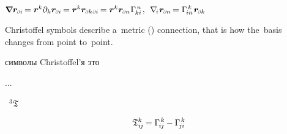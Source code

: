 \begin{otherlanguage}{russian}
${
\boldnabla \locationvector_\differentialindex{i} \hspace{-0.2ex}
= \locationvector^k \partial_k \locationvector_\differentialindex{i} \hspace{-0.2ex}
= \locationvector^k \locationvector_{\differentialindex{k}\hspace{.2ex}\differentialindex{i}} \hspace{-0.2ex}
= \locationvector^k \locationvector_\differentialindex{n} \hspace{.1ex} \Gamma_{\hspace{-0.25ex}ki}^{\hspace{.25ex}n}
\hspace{.2ex} , \:\:
\nabla_{\hspace{-0.32ex}i\hspace{.1ex}} \locationvector_\differentialindex{n} \hspace{-0.25ex}
= \Gamma_{\hspace{-0.25ex}in}^{\hspace{.25ex}k} \hspace{.16ex} \locationvector_\differentialindex{k}
}$

\vspace{.2em}
Christoffel symbols describe a~metric () connection, that is how the~basis changes from point to~point.

символы Christoffel’я это  

...

\href{https://en.wikipedia.org/wiki/Torsion_tensor}{}~${^3\bm{\mathfrak{T}}}$ 

\nopagebreak\vspace{-0.1em}\begin{equation*}
\mathfrak{T}^{k}_{i\hspace{-0.1ex}j} \hspace{-0.15ex} = \Gamma_{\hspace{-0.25ex}i\hspace{-0.1ex}j}^{\hspace{.25ex}k} \hspace{-0.1ex} - \Gamma_{\hspace{-0.33ex}j\hspace{-0.06ex}i}^{\hspace{.25ex}k}
\end{equation*}


\end{otherlanguage}
